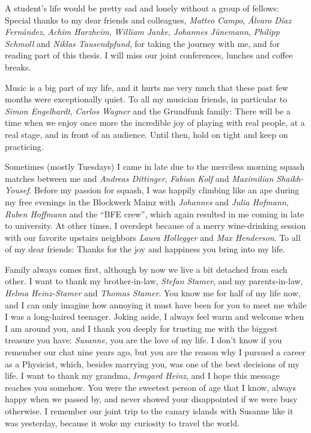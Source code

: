A student's life would be pretty sad and lonely without a group of fellows:
Special thanks to my dear friends and colleagues, {\it Matteo Campo}, {\it Álvaro Díaz Fernández}, {\it Achim Harzheim}, {\it William Janke}, {\it Johannes Jünemann}, {\it Philipp Schmoll} and {\it Niklas Tausendpfund}, for taking the journey with me, and for reading part of this thesis.
I will miss our joint conferences, lunches and coffee breaks.

Music is a big part of my life, and it hurts me very much that these past few months were exceptionally quiet.
To all my musician friends, in particular to {\it Simon Engelhardt}, {\it Carlos Wagner} and the Grundfunk family:
There will be a time when we enjoy once more the incredible joy of playing with real people, at a real stage, and in front of an audience.
Until then, hold on tight and keep on practicing.

Sometimes (mostly Tuesdays) I came in late due to the merciless morning squash matches between me and {\it Andreas Dittinger}, {\it Fabian Kolf} and {\it Maximilian Shaikh-Yousef}.
Before my passion for squash, I was happily climbing like an ape during my free evenings in the Blockwerk Mainz with {\it Johannes} and {\it Julia Hofmann}, {\it Ruben Hoffmann} and the ``BFE crew'', which again resulted in me coming in late to university.
At other times, I overslept because of a merry wine-drinking session with our favorite upstairs neighbors {\it Laura Hollegger} and {\it Max Henderson}.
To all of my dear friends: Thanks for the joy and happiness you bring into my life.

Family always comes first, although by now we live a bit detached from each other.
I want to thank my brother-in-law, {\it Stefan Stamer}, and my parents-in-law, {\it Helma Heinz-Stamer} and {\it Thomas Stamer}.
You know me for half of my life now, and I can only imagine how annoying it must have been for you to meet me while I was a long-haired teenager.
Joking aside, I always feel warm and welcome when I am around you, and I thank you deeply for trusting me with the biggest treasure you have:
{\it Susanne}, you are the love of my life.
I don't know if you remember our chat nine years ago, but you are the reason why I pursued a career as a Physicist, which, besides marrying you, was one of the best decisions of my life.
I want to thank my grandma, {\it Irmgard Heinz}, and I hope this message reaches you somehow.
You were the sweetest person of age that I know, always happy when we passed by, and never showed your disappointed if we were busy otherwise.
I remember our joint trip to the canary islands with Susanne like it was yesterday, because it woke my curiosity to travel the world.

